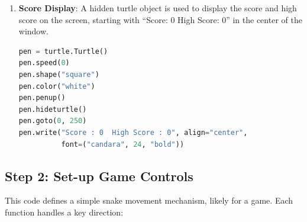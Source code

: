 \begin{enumerate}
  \item \textbf{Score Display}: A hidden turtle object is used to display the score and high score on the screen, starting with “Score: 0 High Score: 0” in the center of the window.
\begin{lstlisting}[language=Python]
pen = turtle.Turtle()
pen.speed(0)
pen.shape("square")
pen.color("white")
pen.penup()
pen.hideturtle()
pen.goto(0, 250)
pen.write("Score : 0  High Score : 0", align="center",
          font=("candara", 24, "bold"))
\end{lstlisting}
\end{enumerate}

\subsection{Step 2: Set-up Game Controls}

This code defines a simple snake movement mechanism, likely for a game. Each function handles a key direction:

